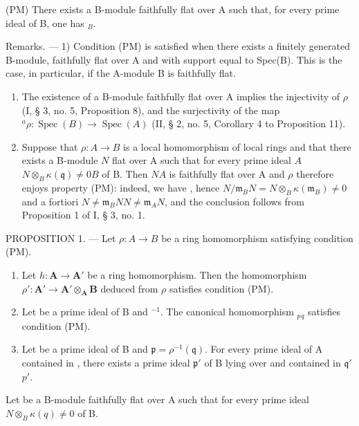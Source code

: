 (PM) There exists a B-module  faithfully flat over A such that, for every prime ideal  of B, one has \(_{B}\).

Remarks. --- 1) Condition (PM) is satisfied when there exists a finitely generated B-module, faithfully flat over A and with support equal to Spec(B). This is the case, in particular, if the A-module B is faithfully flat.

\begin{enumerate}
\def\labelenumi{\arabic{enumi})}
\setcounter{enumi}{1}
\item
  The existence of a B-module  faithfully flat over A implies the injectivity of \(\rho\) (I, § 3, no. 5, Proposition 8), and the surjectivity of the map \({}^{a}\rho : \operatorname{Spec}(B) \to \operatorname{Spec}(A)\) (II, § 2, no. 5, Corollary 4 to Proposition 11).
\item
  Suppose that \(\rho: A \to B\) is a local homomorphism of local rings and that there exists a B-module \(N\) flat over A such that  for every prime ideal \(A\)\(N \otimes_B \kappa(\mathfrak{q}) \neq 0\)\(B\) of B. Then \(N\)\(A\) is faithfully flat over A and \(\rho\) therefore enjoys property (PM): indeed, we have , hence \(N/\mathfrak{m}_{B}N = N \otimes_B \kappa(\mathfrak{m}_{B}) \neq 0\) and a fortiori \(N \neq \mathfrak{m}_{B}N\)\(N \neq \mathfrak{m}_{A}N\), and the conclusion follows from Proposition 1 of I, § 3, no. 1.
\end{enumerate}

PROPOSITION 1. --- Let \(\rho: A \to B\) be a ring homomorphism satisfying condition (PM).

\begin{enumerate}
\def\labelenumi{\alph{enumi})}
\item
  Let \(h: \mathbf{A} \to \mathbf{A}'\) be a ring homomorphism. Then the homomorphism \(\rho': \mathbf{A}' \to \mathbf{A}' \otimes_{\mathbf{A}} \mathbf{B}\) deduced from \(\rho\) satisfies condition (PM).
\item
  Let  be a prime ideal of B and \(^{-1}\). The canonical homomorphism \(_{p}\)\(_{q}\) satisfies condition (PM).
\item
  Let  be a prime ideal of B and \(\mathfrak{p} = \rho^{-1}(\mathfrak{q})\). For every prime ideal  of A contained in , there exists a prime ideal \(\mathfrak{p}'\) of B lying over  and contained in \(\mathfrak{q}'\)\(p'\).
\end{enumerate}

Let  be a B-module faithfully flat over A such that  for every prime ideal \(N \otimes_{B} \kappa(q) \neq 0\) of B.

